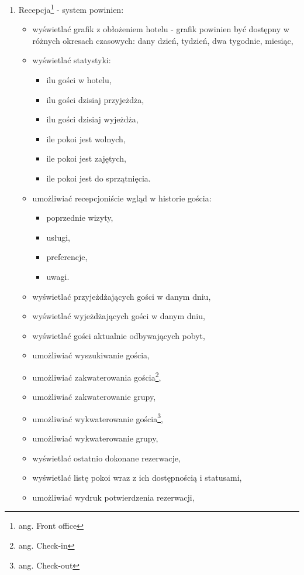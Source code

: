 \documentclass[a4paper,onecolumn,oneside,11pt,wide,floatssmall]{mwrep}
\theoremstyle{definition}
\theoremstyle{plain}%
\theoremstyle{remark}
\begin{document}
\begin{enumerate}
\begin{itemize}
    \end{itemize}
  \item Recepcja\footnote{ang. Front office} - system powinien:
    \begin{itemize}
      \item wyświetlać grafik z obłożeniem hotelu - grafik powinien być dostępny w różnych okresach czasowych: dany dzień, tydzień, dwa tygodnie, miesiąc,
      \item wyświetlać statystyki:
        \begin{itemize}
          \item ilu gości w hotelu,
          \item ilu gości dzisiaj przyjeżdża,
          \item ilu gości dzisiaj wyjeżdża,
          \item ile pokoi jest wolnych,
          \item ile pokoi jest zajętych,
          \item ile pokoi jest do sprzątnięcia.
        \end{itemize}
      \item umożliwiać recepcjoniście wgląd w historie gościa:
        \begin{itemize}
          \item poprzednie wizyty,
          \item usługi,
          \item preferencje,
          \item uwagi.
        \end{itemize}
      \item wyświetlać przyjeżdżających gości w danym dniu,
      \item wyświetlać wyjeżdżających gości w danym dniu,
      \item wyświetlać gości aktualnie odbywających pobyt,
      \item umożliwiać wyszukiwanie gościa,
      \item umożliwiać zakwaterowania gościa\footnote{ang. Check-in},
      \item umożliwiać zakwaterowanie grupy,
      \item umożliwiać wykwaterowanie gościa\footnote{ang. Check-out},
      \item umożliwiać wykwaterowanie grupy,
      \item wyświetlać ostatnio dokonane rezerwacje,
      \item wyświetlać listę pokoi wraz z ich dostępnością i statusami,
      \item umożliwiać wydruk potwierdzenia rezerwacji,

\end{itemize}
\end{enumerate}
\end{document}
